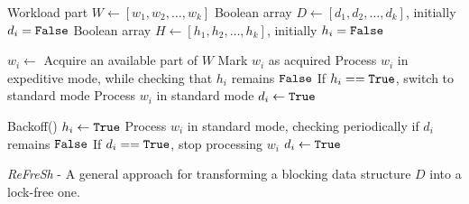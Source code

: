 \begin{algorithm}[htbp]
    \footnotesize
    \vspace*{2mm}
    
    \begin{algorithmic}[1]
    
        \State Workload part $\mathit{W} \gets [w_1, w_2, \ldots, w_k]$ \label{alg:refresh:w}
        \State Boolean array $\mathit{D} \gets [d_1, d_2, \ldots, d_k]$, initially $d_i = \mbox{\texttt{False}}$ \label{alg:refresh:d}
        \State Boolean array $\mathit{H} \gets [h_1, h_2, \ldots, h_k]$, initially $h_i = \mbox{\texttt{False}}$ \label{alg:refresh:h}
    \EndProcedure
    
    \vspace*{1mm}
    \vspace*{1mm}
    
          \label{alg:refresh:process:start}
            \State $\mathit{w_i} \gets$ Acquire an available part of $\mathit{W}$
            \State Mark $\mathit{w_i}$ as acquired
              \label{alg:refresh:process:if}
                \State Process $\mathit{w_i}$ in expeditive mode, while checking that $h_i$ remains $\mbox{\texttt{False}}$ \label{alg:refresh:process:expeditive}
                \State If $h_i == \mbox{\texttt{True}}$, switch to standard mode
            \Else
                \State Process $\mathit{w_i}$ in standard mode \label{alg:refresh:process:standard}
            \EndIf
            \State $d_i \gets \mbox{\texttt{True}}$ \label{alg:refresh:d:true}
        \EndWhile
        
        \vspace*{1mm}
          \label{alg:refresh:scan:ForAll} 
            \State Backoff()   \label{alg:refresh:help:backoff}
              \label{alg:refresh:help:if}
                \State $h_i \gets \mbox{\texttt{True}}$ \label{alg:refresh:h:true}
                \State Process $\mathit{w_i}$ in standard mode, checking periodically if $d_i$ remains $\mbox{\texttt{False}}$ \label{alg:refresh:help:process}
                \State If $d_i == \mbox{\texttt{True}}$, stop processing $\mathit{w_i}$
                \State $d_i \gets \mbox{\texttt{True}}$ \label{alg:refresh:help:d:true}
            \EndIf
        \EndFor
    \EndProcedure
    
    \end{algorithmic}
    
    \caption{\textit{ReFreSh} - A general approach for transforming a blocking data structure $\mathit{D}$ into a lock-free one.}
    \label{alg:refresh}
\end{algorithm}

